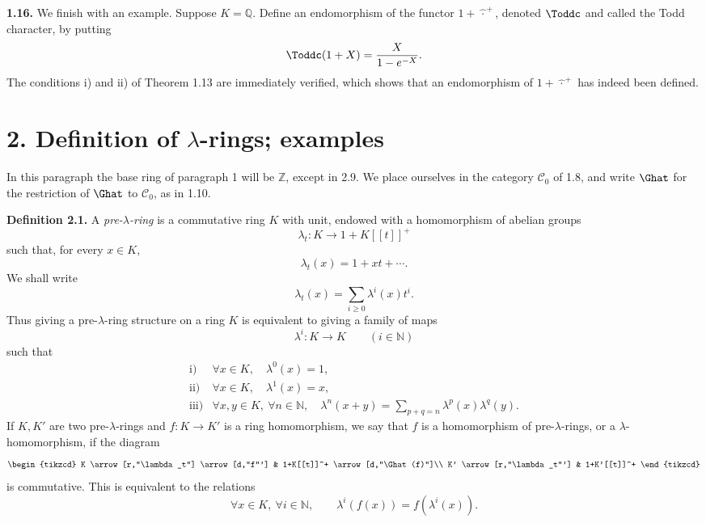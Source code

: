 \documentclass[11pt]{article}
\begin{document}
\textbf{1.16.} We finish with an example. Suppose \(K=\mathbb Q\). Define an endomorphism of the functor \(1+\widehat{\,\cdot\,}^{+}\), denoted \(\Toddc\) and called the Todd character, by putting
\[
  \Toddc(1+X)=\frac{X}{1-e^{-X}}.
\]
The conditions i) and ii) of Theorem 1.13 are immediately verified, which shows that an endomorphism of \(1+\widehat{\,\cdot\,}^{+}\) has indeed been defined.

\section*{2. Definition of \(\lambda\)-rings; examples}

In this paragraph the base ring of paragraph 1 will be \(\mathbb Z\), except in 2.9. We place ourselves in the category \(\mathcal C_0\) of 1.8, and write \(\Ghat\) for the restriction of \(\Ghat\) to \(\mathcal C_0\), as in 1.10.

\textbf{Definition 2.1.} A \emph{pre-\(\lambda\)-ring} is a commutative ring \(K\) with unit, endowed with a homomorphism of abelian groups
\[
  \lambda_t:K\longrightarrow 1+K[[t]]^+
\]
such that, for every \(x\in K\),
\[
  \lambda_t(x)=1+xt+\cdots.
\]
We shall write
\[
  \lambda_t(x)=\sum_{i\geq 0}\lambda^i(x)t^i.
\]
Thus giving a pre-\(\lambda\)-ring structure on a ring \(K\) is equivalent to giving a family of maps
\[
  \lambda^i:K\longrightarrow K\qquad (i\in\mathbb N)
\]
such that
\[
\begin{array}{ll}
\text{i)}&\forall x\in K,\quad \lambda^0(x)=1,\\[0.3em]
\text{ii)}&\forall x\in K,\quad \lambda^1(x)=x,\\[0.3em]
\text{iii)}&\forall x,y\in K,\ \forall n\in\mathbb N,\quad
\lambda^n(x+y)=\displaystyle\sum_{p+q=n}\lambda^p(x)\lambda^q(y).
\end{array}
\]
If \(K,K'\) are two pre-\(\lambda\)-rings and \(f:K\to K'\) is a ring homomorphism, we say that \(f\) is a homomorphism of pre-\(\lambda\)-rings, or a \(\lambda\)-homomorphism, if the diagram
\[
\begin{tikzcd}
K \arrow[r,"\lambda_t"] \arrow[d,"f"'] &
1+K[[t]]^+ \arrow[d,"\Ghat(f)"]\\
K' \arrow[r,"\lambda_t"'] &
1+K'[[t]]^+
\end{tikzcd}
\]
is commutative. This is equivalent to the relations
\[
  \forall x\in K,\ \forall i\in\mathbb N,\qquad
  \lambda^i(f(x))=f(\lambda^i(x)).
\]
\end{document}
